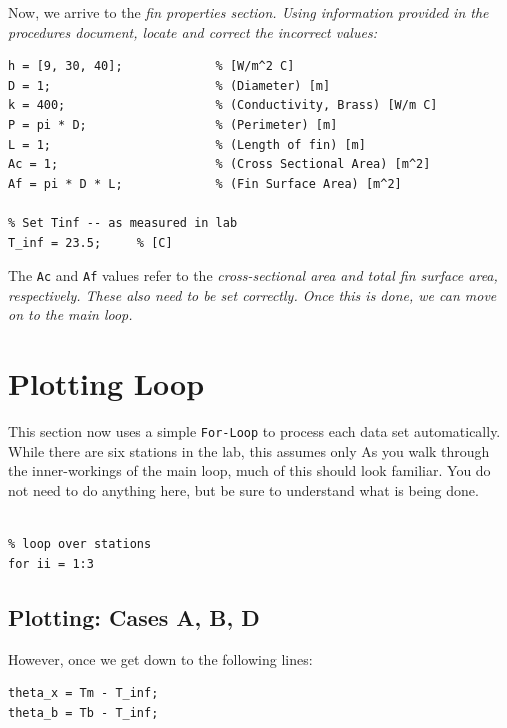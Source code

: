 \documentclass[11pt, letterpaper]{article}
\begin{document}
Now, we arrive to the \it{fin properties} section. 
\n
\textcolor{dkred}{} \it{Using information provided in the procedures document, locate and correct the incorrect values:}
\n
\begin{lstlisting}[numbers=none]
% Fin Properties **FIX ME**
h = [9, 30, 40];             % [W/m^2 C]
D = 1;                       % (Diameter) [m]
k = 400;                     % (Conductivity, Brass) [W/m C]
P = pi * D;                  % (Perimeter) [m]
L = 1;                       % (Length of fin) [m]
Ac = 1;                      % (Cross Sectional Area) [m^2]
Af = pi * D * L;             % (Fin Surface Area) [m^2]

% Set Tinf -- as measured in lab
T_inf = 23.5;     % [C]
\end{lstlisting}

\n
{} The \texttt{Ac} and \texttt{Af} values refer to the \it{cross-sectional area} and \it{total fin surface area}, respectively. These also need to be set correctly. Once this is done, we can move on to the main loop.

\section{Plotting Loop}

This section now uses a simple \texttt{For-Loop} to process each data set automatically. While there are six stations in the lab, this assumes only 
\n
As you walk through the inner-workings of the main loop, much of this should look familiar. You do not need to do anything here, but be sure to understand what is being done.

\n
\begin{lstlisting}[numbers=none]
%% =========== Part 2: Loop over data & Plot ============= 

% loop over stations
for ii = 1:3 
\end{lstlisting}

\n
\subsection{Plotting: Cases A, B, D}

However, once we get down to the following lines:
\n
\begin{lstlisting}[numbers=none]
% The fin excess temperatures
theta_x = Tm - T_inf;
theta_b = Tb - T_inf;
\end{lstlisting}
\end{document}
